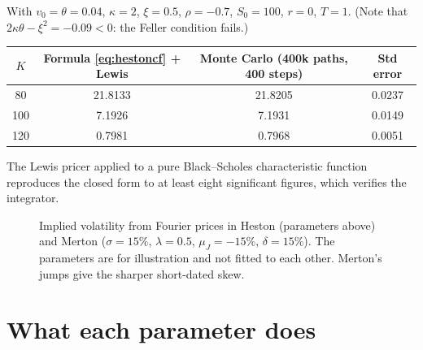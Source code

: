 \begin{numcheck}
With $v_0=\theta=0.04$, $\kappa=2$, $\xi=0.5$, $\rho=-0.7$, $S_0=100$, $r=0$, $T=1$. (Note that $2\kappa\theta-\xi^2=-0.09<0$: the Feller condition fails.)
\begin{center}
\begin{tabular}{cccc}
\toprule
$K$ & Formula \eqref{eq:hestoncf} + Lewis & Monte Carlo (400k paths, 400 steps) & Std error\\
\midrule
80 & 21.8133 & 21.8205 & 0.0237\\
100 & 7.1926 & 7.1931 & 0.0149\\
120 & 0.7981 & 0.7968 & 0.0051\\
\bottomrule
\end{tabular}
\end{center}
The Lewis pricer applied to a pure Black--Scholes characteristic function reproduces the closed form to at least eight significant figures, which verifies the integrator.
\end{numcheck}

\begin{figure}[t]
\centering
{}
\caption{Implied volatility from Fourier prices in Heston (parameters above) and Merton ($\sigma=15\%$, $\lambda=0.5$, $\mu_J=-15\%$, $\delta=15\%$). The parameters are for illustration and not fitted to each other. Merton's jumps give the sharper short-dated skew.}\label{fig:smile}
\end{figure}

\section{What each parameter does}

